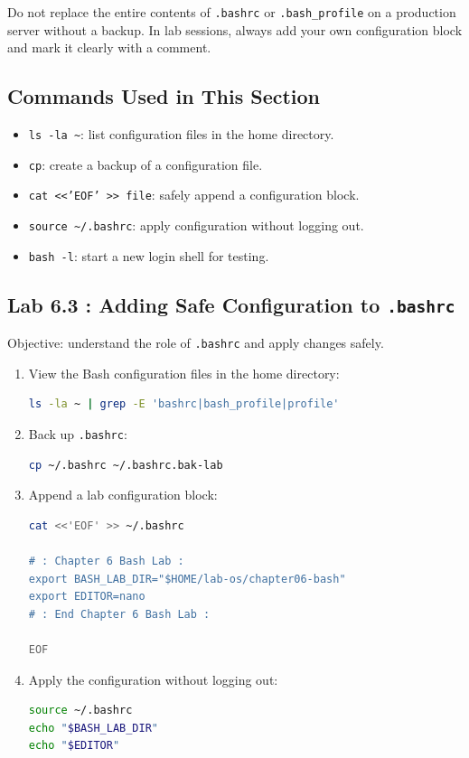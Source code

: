 \begin{notebox}
Do not replace the entire contents of \texttt{.bashrc} or
\texttt{.bash\_profile} on a production server without a backup. In lab
sessions, always add your own configuration block and mark it clearly with a
comment.
\end{notebox}

\subsection*{Commands Used in This Section}

\begin{itemize}
  \item \texttt{ls -la \textasciitilde}: list configuration files in the home directory.
  \item \texttt{cp}: create a backup of a configuration file.
  \item \texttt{cat <<'EOF' >> file}: safely append a configuration block.
  \item \texttt{source \textasciitilde/.bashrc}: apply configuration without logging out.
  \item \texttt{bash -l}: start a new login shell for testing.
\end{itemize}

\subsection*{Lab 6.3 : Adding Safe Configuration to \texttt{.bashrc}}

Objective: understand the role of \texttt{.bashrc} and apply changes safely.

\begin{enumerate}
  \item View the Bash configuration files in the home directory:
\begin{lstlisting}[language=bash, caption={Listing Bash configuration files}]
ls -la ~ | grep -E 'bashrc|bash_profile|profile'
\end{lstlisting}

  \item Back up \texttt{.bashrc}:
\begin{lstlisting}[language=bash, caption={Backing up .bashrc}]
cp ~/.bashrc ~/.bashrc.bak-lab
\end{lstlisting}

  \item Append a lab configuration block:
\begin{lstlisting}[language=bash, caption={Adding configuration to .bashrc}]
cat <<'EOF' >> ~/.bashrc

# : Chapter 6 Bash Lab :
export BASH_LAB_DIR="$HOME/lab-os/chapter06-bash"
export EDITOR=nano
# : End Chapter 6 Bash Lab :

EOF
\end{lstlisting}

  \item Apply the configuration without logging out:
\begin{lstlisting}[language=bash, caption={Reloading .bashrc}]
source ~/.bashrc
echo "$BASH_LAB_DIR"
echo "$EDITOR"
\end{lstlisting}
\end{enumerate}

